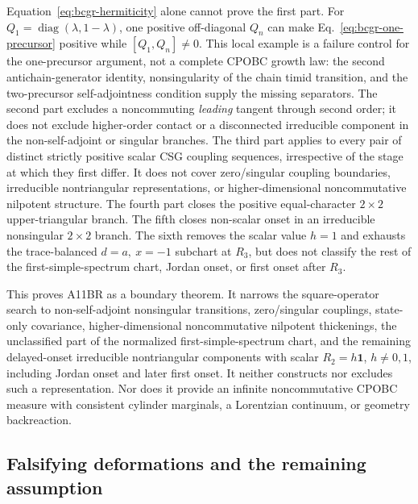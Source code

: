 Equation~\eqref{eq:bcgr-hermiticity} alone cannot prove the first part.  For
\(Q_1=\operatorname{diag}(\lambda,1-\lambda)\), one positive off-diagonal
\(Q_n\) can make Eq.~\eqref{eq:bcgr-one-precursor} positive while
\([Q_1,Q_n]\ne0\).  This local example is a failure control for the
one-precursor argument, not a complete CPOBC growth law: the second
antichain-generator identity, nonsingularity of the chain timid transition,
and the two-precursor self-adjointness condition supply the missing
separators.  The second part excludes a noncommuting
\emph{leading} tangent through second order; it does not exclude
higher-order contact or a disconnected irreducible component in the
non-self-adjoint or singular branches.  The third part applies to every
pair of distinct strictly positive scalar CSG coupling sequences,
irrespective of the stage at which they first differ.  It does not cover
zero/singular coupling boundaries, irreducible nontriangular
representations, or higher-dimensional noncommutative nilpotent structure.
The fourth part closes the positive equal-character \(2\times2\)
upper-triangular branch.  The fifth closes non-scalar onset in an
irreducible nonsingular \(2\times2\) branch.  The sixth removes the scalar
value \(h=1\) and exhausts the trace-balanced \(d=a,\ x=-1\) subchart at
\(R_3\), but does not classify the rest of the first-simple-spectrum chart,
Jordan onset, or first onset after \(R_3\).

This proves A11BR as a boundary theorem.  It narrows the square-operator
search to non-self-adjoint nonsingular transitions, zero/singular
couplings, state-only covariance, higher-dimensional noncommutative
nilpotent thickenings, the unclassified part of the normalized
first-simple-spectrum chart, and the remaining delayed-onset irreducible
nontriangular components with scalar \(R_2=h\mathbf1\), \(h\ne0,1\),
including Jordan onset and later first onset.
It neither constructs nor excludes such a representation.  Nor does it
provide an infinite noncommutative CPOBC measure with consistent cylinder
marginals, a Lorentzian continuum, or geometry backreaction.

\subsection{Falsifying deformations and the remaining assumption}

